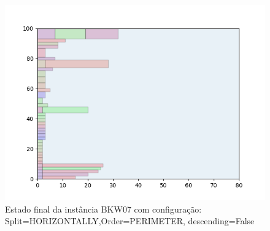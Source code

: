 \begin{figure}[H]
    \centering
    \caption[]{Estado final da instância BKW07 com configuração: Split=HORIZONTALLY,Order=PERIMETER, descending=False}
    \label{fig:bkw07-horizontally-perimeter-false}
    \includegraphics[scale=0.5]{output/figures/bkw/bkw07/horizontally/perimeter/false/00}
\end{figure}
